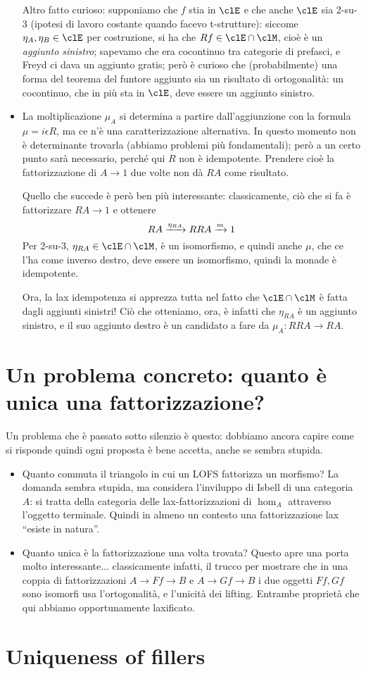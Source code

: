 \documentclass{amsart}
\begin{document}
\begin{itemize}
  Altro fatto curioso: supponiamo che $f$ stia in $\clE$ e che anche $\clE$ sia 2-su-3 (ipotesi di lavoro costante quando facevo t-strutture): siccome $\eta_A, \eta_B \in\clE$ per costruzione, si ha che $Rf \in\clE\cap\clM$, cioè è un \emph{aggiunto sinistro}; sapevamo che era cocontinuo tra categorie di prefasci, e Freyd ci dava un aggiunto gratis; però è curioso che (probabilmente) una forma del teorema del funtore aggiunto sia un risultato di ortogonalità: un cocontinuo, che in più sta in $\clE$, deve essere un aggiunto sinistro.
  \item La moltiplicazione $\mu_A$ si determina a partire dall'aggiunzione con la formula $\mu = i\epsilon R$, ma ce n'è una caratterizzazione alternativa. In questo momento non è determinante trovarla (abbiamo problemi più fondamentali); però a un certo punto sarà necessario, perché qui $R$ non è idempotente. Prendere cioè la fattorizzazione di $A\to 1$ due volte non dà $RA$ come risultato.

  Quello che succede è però ben più interessante: classicamente, ciò che si fa è fattorizzare $RA\to 1$ e ottenere
  \[RA \xrightarrow{\eta_{RA}} RRA \xrightarrow{m} 1 \]
  Per 2-su-3, $\eta_{RA}\in\clE\cap\clM$, è un isomorfismo, e quindi anche $\mu$, che ce l'ha come inverso destro, deve essere un isomorfismo, quindi la monade è idempotente.

  Ora, la lax idempotenza si apprezza tutta nel fatto che $\clE\cap \clM$ è fatta dagli aggiunti sinistri! Ciò che otteniamo, ora, è infatti che $\eta_{RA}$ è un aggiunto sinistro, e il suo aggiunto destro è un candidato a fare da $\mu_A : RRA \to RA$.
\end{itemize}
\section{Un problema concreto: quanto è unica una fattorizzazione?}
Un problema che è passato sotto silenzio è questo: dobbiamo ancora capire come si risponde quindi ogni proposta è bene accetta, anche se sembra stupida.
\begin{itemize}
  \item Quanto commuta il triangolo in cui un LOFS fattorizza un morfismo? La domanda sembra stupida, ma considera l'inviluppo di Isbell di una categoria $A$: si tratta della categoria delle lax-fattorizzazioni di $\hom_A$ attraverso l'oggetto terminale. Quindi in almeno un contesto una fattorizzazione lax ``esiste in natura''.
  \item Quanto unica è la fattorizzazione una volta trovata? Questo apre una porta molto interessante... classicamente infatti, il trucco per mostrare che in una coppia di fattorizzazioni $A \to Ff \to B$ e $A \to Gf\to B$ i due oggetti $Ff,Gf$ sono isomorfi usa l'ortogonalità, e l'unicità dei lifting. Entrambe proprietà che qui abbiamo opportunamente laxificato.
\end{itemize}
\section{Uniqueness of fillers}
\end{document}
